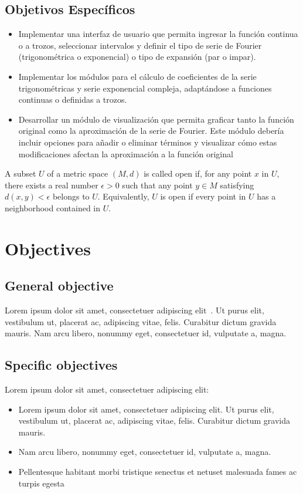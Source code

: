 \subsection{Objetivos Específicos}
\begin{itemize}
	\item Implementar una interfaz de usuario que permita ingresar la función continua o a trozos, seleccionar intervalos y definir el tipo de serie de Fourier (trigonométrica o exponencial) o tipo de expansión (par o impar).
	\item Implementar los módulos para el cálculo de coeficientes de la serie trigonométricas y serie exponencial compleja, adaptándose a funciones continuas o definidas a trozos.
	\item  Desarrollar un módulo de visualización que permita graficar tanto la función original como la
	aproximación de la serie de Fourier. Este módulo debería incluir opciones para añadir o eliminar términos y visualizar cómo estas modificaciones afectan la aproximación a la función original
\end{itemize}


\begin{definition}
A subset $U$ of a metric space $(M, d)$ is called open if, for any point $x$ in $U$, there exists a real number $\epsilon > 0$ such that any point $y\in M$ satisfying $d(x, y) < \epsilon$ belongs to $U$. Equivalently, $U$ is open if every point in $U$ has a neighborhood contained in $U$.
\end{definition}
\lipsum[1]

\section{Objectives}
\subsection{General objective}
Lorem ipsum dolor sit amet, consectetuer adipiscing elit~\cite{adam2015higgs, atlas2014neural, baldi2014searching}. Ut purus elit, vestibulum ut, placerat ac, adipiscing vitae, felis. Curabitur dictum gravida mauris. Nam arcu libero, nonummy eget, consectetuer id, vulputate a, magna.

\subsection{Specific objectives}
Lorem ipsum dolor sit amet, consectetuer adipiscing elit:
\begin{itemize}
    \item Lorem ipsum dolor sit amet, consectetuer adipiscing elit. Ut purus elit, vestibulum ut, placerat ac, adipiscing vitae, felis. Curabitur dictum gravida mauris.
    \item Nam arcu libero, nonummy eget, consectetuer id, vulputate a, magna.
    \item  Pellentesque habitant morbi tristique senectus et netuset malesuada fames ac turpis egesta
\end{itemize}

